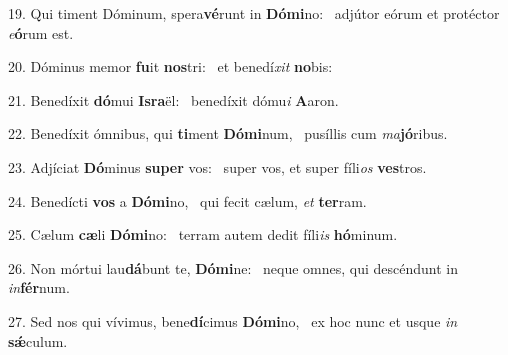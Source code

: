 19. Qui timent Dóminum, spera\textbf{vé}runt in \textbf{Dó}\textbf{mi}no: \ast\  adjútor eórum et protéctor \textit{e}\textbf{ó}rum est.\

20. Dóminus memor \textbf{fu}it \textbf{nos}tri: \ast\  et benedí\textit{xit} \textbf{no}bis:\

21. Benedíxit \textbf{dó}mui \textbf{Is}\textbf{ra}ël: \ast\  benedíxit dómu\textit{i} \textbf{A}aron.\

22. Benedíxit ómnibus, qui \textbf{ti}ment \textbf{Dó}\textbf{mi}num, \ast\  pusíllis cum \textit{ma}\textbf{jó}ribus.\

23. Adjíciat \textbf{Dó}minus \textbf{su}\textbf{per} vos: \ast\  super vos, et super fíli\textit{os} \textbf{ves}tros.\

24. Benedícti \textbf{vos} a \textbf{Dó}\textbf{mi}no, \ast\  qui fecit cælum, \textit{et} \textbf{ter}ram.\

25. Cælum \textbf{cæ}li \textbf{Dó}\textbf{mi}no: \ast\  terram autem dedit fíli\textit{is} \textbf{hó}minum.\

26. Non mórtui lau\textbf{dá}bunt te, \textbf{Dó}\textbf{mi}ne: \ast\  neque omnes, qui descéndunt in \textit{in}\textbf{fér}num.\

27. Sed nos qui vívimus, bene\textbf{dí}cimus \textbf{Dó}\textbf{mi}no, \ast\  ex hoc nunc et usque \textit{in} \textbf{sǽ}culum.\

